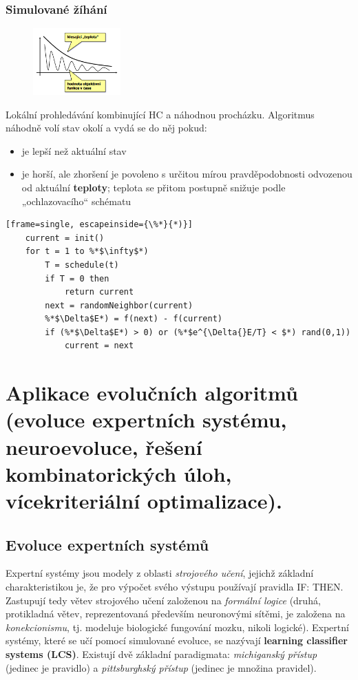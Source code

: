 \subsubsection{Simulované žíhání}
	\setlength\intextsep{0pt}
\begin{figure}
	\centering

	\includegraphics[width=0.3\textwidth]{img/simulated_annealing.png}
\end{figure}
Lokální prohledávání kombinující HC a náhodnou procházku. Algoritmus náhodně volí stav okolí a vydá se do něj pokud:
\begin{itemize}
	
	
	\item je lepší než aktuální stav
	\item je horší, ale zhoršení je povoleno s určitou mírou pravděpodobnosti odvozenou od aktuální \textbf{teploty}; teplota se přitom postupně snižuje podle „ochlazovacího“ schématu
\end{itemize}


\begin{minipage}{\linewidth}
\begin{lstlisting}[frame=single, escapeinside={\%*}{*)}]
	current = init()
	for t = 1 to %*$\infty$*)
		T = schedule(t)
		if T = 0 then 
			return current
		next = randomNeighbor(current)
		%*$\Delta$E*) = f(next) - f(current)
		if (%*$\Delta$E*) > 0) or (%*$e^{\Delta{}E/T} < $*) rand(0,1))
			current = next
\end{lstlisting}
\end{minipage}






\section{Aplikace evolučních algoritmů (evoluce expertních systému, neuroevoluce, řešení kombinatorických úloh, vícekriteriální optimalizace).}
\subsection{Evoluce expertních systémů}
Expertní systémy jsou modely z oblasti \textit{strojového učení}, jejichž základní charakteristikou je, že pro výpočet svého výstupu používají pravidla IF: THEN. Zastupují tedy větev strojového učení založenou na \textit{formální logice} (druhá, protikladná větev, reprezentovaná především neuronovými sítěmi, je založena na \textit{konekcionismu}, tj. modeluje biologické fungování mozku, nikoli logické). Expertní systémy, které se učí pomocí simulované evoluce, se nazývají \textbf{learning classifier systems (LCS)}. Existují dvě základní paradigmata: \textit{michiganský přístup} (jedinec je pravidlo) a \textit{pittsburghský přístup} (jedinec je množina pravidel).

